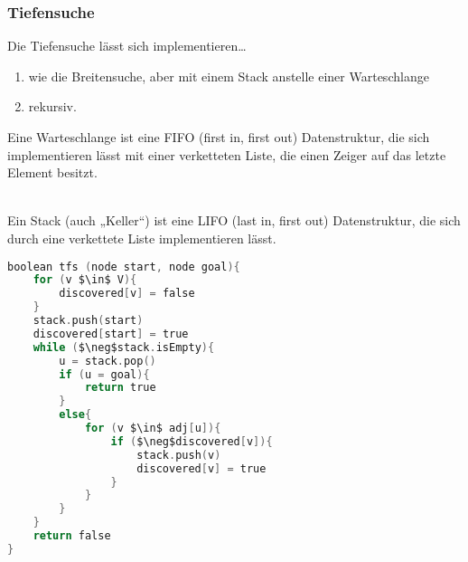 \subsubsection{Tiefensuche}
Die Tiefensuche lässt sich implementieren…
\begin{enumerate}
\item wie die Breitensuche, aber mit einem Stack anstelle einer Warteschlange
\item rekursiv.
\end{enumerate}
Eine Warteschlange ist eine FIFO (first in, first out) Datenstruktur, die sich implementieren lässt mit einer verketteten Liste, die einen Zeiger auf das letzte Element besitzt.\\
\\
Ein Stack (auch „Keller“) ist eine LIFO (last in, first out) Datenstruktur, die sich durch eine verkettete Liste implementieren lässt.\\
\begin{lstlisting}[language=C]
boolean tfs (node start, node goal){
	for (v $\in$ V){
		discovered[v] = false
	}
	stack.push(start)
	discovered[start] = true
	while ($\neg$stack.isEmpty){
		u = stack.pop()
		if (u = goal){
			return true
		}
		else{
			for (v $\in$ adj[u]){
				if ($\neg$discovered[v]){
					stack.push(v)
					discovered[v] = true
				}
			}
		}
	}
	return false
}
\end{lstlisting}

